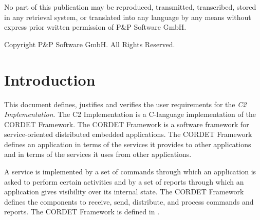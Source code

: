 \documentclass[a4paper,10pt]{article}
\let\stdsection\section
\renewcommand\section{\newpage\stdsection}
\begin{document}
\newpage
\tableofcontents

\newpage
\listoffigures
\listoftables


\newpage
\vspace*{\fill}
\begin{center}
No part of this publication may be reproduced, transmitted, transcribed, stored in any retrieval system, or translated into any language by any means without express prior written permission of P\&P Software GmbH.
\end{center}

\begin{center}
Copyright  P\&P Software GmbH. All Rights Reserved. 
\end{center}
\vspace*{\fill}

\setlength{\parskip}{3mm}						%


\newpage


\section{Introduction}
This document defines, justifies and verifies the user requirements for the \textit{C2 Implementation}. The C2 Implementation is a C-language implementation of the CORDET Framework. The CORDET Framework is a software framework for service-oriented distributed embedded applications. The CORDET Framework defines an application in terms of the services it provides to other applications and in terms of the services it uses from other applications.

A service is implemented by a set of commands through which an application is asked to perform certain activities and by a set of reports through which an application gives visibility over its internal state. The CORDET Framework defines the components to receive, send, distribute, and process commands and reports. The CORDET Framework is defined in \cite{ref:cordetfw}. 
\end{document}
